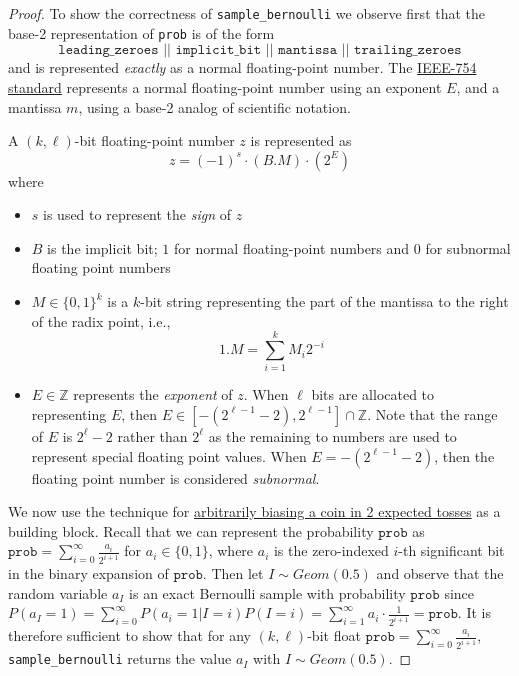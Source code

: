\documentclass{article}
\begin{document}
\begin{proof}
To show the correctness of \texttt{sample\_bernoulli} we observe first that the base-2 representation of \texttt{prob} is of the form
\[
\texttt{leading\_zeroes || implicit\_bit || mantissa || trailing\_zeroes}
\]
and is represented \emph{exactly} as a normal floating-point number. The \href{https://en.wikipedia.org/wiki/IEEE_754}{IEEE-754 standard} represents a normal floating-point number using an exponent $E$, and a mantissa $m$, using a base-2 analog of scientific notation.

\begin{definition}
A $(k,\ell)$-bit floating-point number $z$ is represented as
\[
z = (-1)^s \cdot (B.M) \cdot (2^E)
\]
where
\begin{itemize}
    \item $s$ is used to represent the \emph{sign} of $z$
    \item $B$ is the implicit bit; $1$ for normal floating-point numbers and $0$ for subnormal floating point numbers
    \item $M \in \{0,1\}^k$ is a $k$-bit string representing the part of the mantissa to the right of the radix point, i.e.,
    \[
    1.M = \sum_{i = 1}^k M_i2^{-i}
    \]
    \item $E \in \mathbb{Z}$ represents the \emph{exponent} of $z$. When $\ell$ bits are allocated to representing $E$, then $E \in [-(2^{\ell - 1} - 2), 2^{\ell - 1}] \cap \mathbb{Z}$. Note that the range of $E$ is $2^\ell - 2$ rather than $2^\ell$ as the remaining to numbers are used to represent special floating point values. When $E = -(2^{\ell -1} - 2)$, then the floating point number is considered \emph{subnormal}.
\end{itemize}
\end{definition}

We now use the technique for \href{https://web.archive.org/web/20160418185834/https://amakelov.wordpress.com/2013/10/10/arbitrarily-biasing-a-coin-in-2-expected-tosses/}{arbitrarily biasing a coin in 2 expected tosses} as a building block. Recall that we can represent the probability $\texttt{prob}$ as $\texttt{prob} = \sum_{i = 0}^\infty \frac{a_i}{2^{i + 1}}$ for $a_i \in \{0, 1\}$, where $a_i$ is the zero-indexed $i$-th significant bit in the binary expansion of $\texttt{prob}$. Then let $I \sim Geom(0.5)$ and observe that the random variable $a_I$ is an exact Bernoulli sample with probability $\texttt{prob}$ since $P(a_I = 1) = \sum_{i = 0}^\infty P(a_i = 1|I = i)P(I = i) = \sum_{i = 1}^\infty a_i \cdot \frac{1}{2^{i + 1}} = \texttt{prob}$. It is therefore sufficient to show that for any $(k,\ell)$-bit float $\texttt{prob} = \sum_{i = 0}^\infty \frac{a_i}{2^{i + 1}}$, \texttt{sample\_bernoulli} returns the value $a_I$ with $I \sim Geom(0.5)$.


\end{proof}
\end{document}
